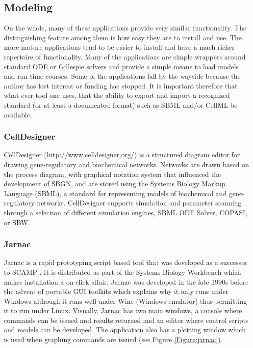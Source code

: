 \subsection{Modeling}

On the whole, many of these applications provide very similar
functionality. The distinguishing feature among them is how easy they
are to install and use. The more mature applications tend to be easier
to install and have a much richer repertoire of functionality. Many of
the applications are simple wrappers around standard ODE or Gillespie
solvers and provide a simple means to load models and run time courses.
Some of the applications fall by the wayside because the author has lost
interest or funding has stopped. It is important therefore that what
ever tool one uses, that the ability to export and import a recognized
standard (or at least a documented format) such as SBML and/or CellML be
available.

\subsubsection{CellDesigner}

CellDesigner (\url{http://www.celldesigner.org/})
\autocite{funahashi2003celldesigner}
\autocite{funahashi2008celldesigner} is a structured diagram editor for
drawing gene-regulatory and biochemical networks. Networks are drawn
based on the process diagram, with graphical notation system that
influenced the development of SBGN, and are stored using the Systems
Biology Markup Language (SBML), a standard for representing models of
biochemical and gene-regulatory networks. CellDesigner supports
simulation and parameter scanning through a selection of different
simulation engines, SBML ODE Solver, COPASI, or SBW.

\subsubsection{Jarnac}

Jarnac \autocite{sauro:2000} \autocite{bergmann2006sbw} is a rapid
prototyping script based tool that was developed as a successor to SCAMP
\autocite{SauroF91}. It is distributed as part of the Systems Biology
Workbench which makes installation a on-click affair. Jarnac was
developed in the late 1990s before the advent of portable GUI toolkits
which explains why it only runs under Windows although it runs well
under Wine (Windows emulator) thus permitting it to run under Linux.
Visually, Jarnac has two main windows, a console where commands can be
issued and results returned and an editor where control scripts and
models can be developed. The application also has a plotting window
which is used when graphing commands are issued (see Figure
\ref{Figure:jarnac}).

